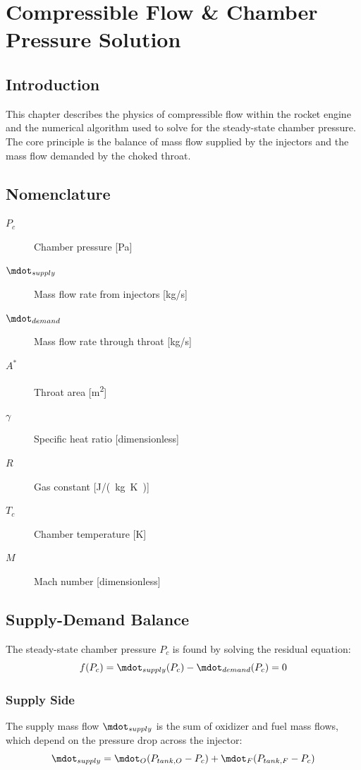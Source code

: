 \section{Compressible Flow \& Chamber Pressure Solution}

\subsection{Introduction}
This chapter describes the physics of compressible flow within the rocket engine and the numerical algorithm used to solve for the steady-state chamber pressure. The core principle is the balance of mass flow supplied by the injectors and the mass flow demanded by the choked throat.

\subsection{Nomenclature}
\begin{description}
    \item[\(P_c\)] Chamber pressure [\si{Pa}]
    \item[\(\mdot_{supply}\)] Mass flow rate from injectors [\si{kg/s}]
    \item[\(\mdot_{demand}\)] Mass flow rate through throat [\si{kg/s}]
    \item[\(A^*\)] Throat area [\si{m^2}]
    \item[\(\gamma\)] Specific heat ratio [dimensionless]
    \item[\(R\)] Gas constant [\si{J/(kg.K)}]
    \item[\(T_c\)] Chamber temperature [\si{K}]
    \item[\(M\)] Mach number [dimensionless]
\end{description}

\subsection{Supply-Demand Balance}
The steady-state chamber pressure \(P_c\) is found by solving the residual equation:
\begin{equation}
f(P_c) = \mdot_{supply}(P_c) - \mdot_{demand}(P_c) = 0
\end{equation}

\subsubsection{Supply Side}
The supply mass flow \(\mdot_{supply}\) is the sum of oxidizer and fuel mass flows, which depend on the pressure drop across the injector:
\begin{equation}
\mdot_{supply} = \mdot_O(P_{tank,O} - P_c) + \mdot_F(P_{tank,F} - P_c)
\end{equation}

